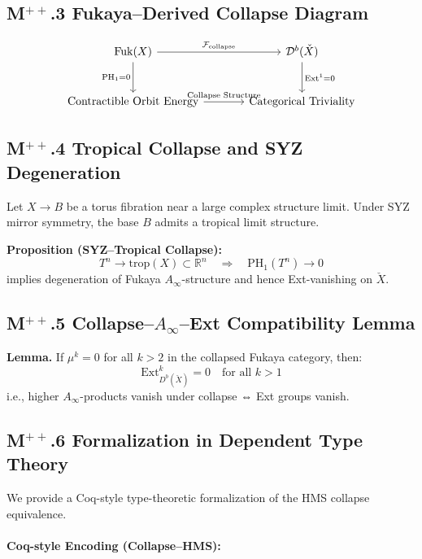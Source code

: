 \documentclass[11pt]{article}
\begin{document}
\begin{axiom}
\begin{axiom}
{{\subsection*{M$^{++}$.3 Fukaya–Derived Collapse Diagram}

\[
\begin{tikzcd}[row sep=large, column sep=large]
\mathrm{Fuk}(X) \arrow[r, "\mathcal{F}_{\mathrm{collapse}}"] \arrow[d, swap, "\text{PH}_1 = 0"]
& \mathcal{D}^b(\check{X}) \arrow[d, "\text{Ext}^1 = 0"] \\
\text{Contractible Orbit Energy} \arrow[r, "\text{Collapse Structure}"]
& \text{Categorical Triviality}
\end{tikzcd}
\]

\subsection*{M$^{++}$.4 Tropical Collapse and SYZ Degeneration}

Let \( X \to B \) be a torus fibration near a large complex structure limit.  
Under SYZ mirror symmetry, the base \( B \) admits a tropical limit structure.

\textbf{Proposition (SYZ–Tropical Collapse):}
\[
T^n \to \text{trop}(X) \subset \mathbb{R}^n \quad \Rightarrow \quad \mathrm{PH}_1(T^n) \to 0
\]
implies degeneration of Fukaya \( A_\infty \)-structure and hence Ext-vanishing on \( \check{X} \).

\subsection*{M$^{++}$.5 Collapse–\( A_\infty \)–Ext Compatibility Lemma}

\textbf{Lemma.}  
If \( \mu^k = 0 \) for all \( k > 2 \) in the collapsed Fukaya category, then:
\[
\mathrm{Ext}^k_{D^b(\check{X})} = 0 \quad \text{for all } k > 1
\]
i.e., higher \( A_\infty \)-products vanish under collapse ⇔ Ext groups vanish.

\subsection*{M$^{++}$.6 Formalization in Dependent Type Theory}

We provide a Coq-style type-theoretic formalization of the HMS collapse equivalence.

\paragraph{Coq-style Encoding (Collapse–HMS):}

}}
\end{axiom}
\end{axiom}
\end{document}
